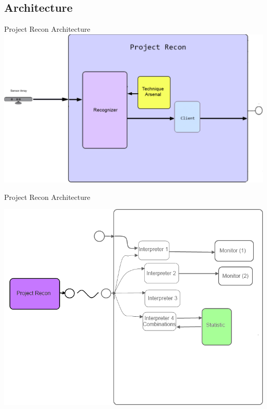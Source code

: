 \documentclass{beamer}
\begin{document}
\subsection{Architecture}

\begin{frame}{Project Recon Architecture}
 \includegraphics[scale = 0.3] {project_Recon_diagram.png}
\end{frame}

\begin{frame}{Project Recon Architecture}
\centerline{ \includegraphics[scale = 0.4] {partner.png}}
\end{frame}
\end{document}
